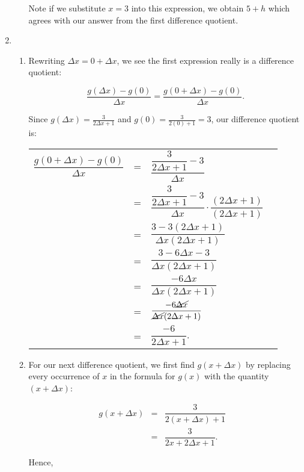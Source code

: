 \begin{ex}
\begin{enumerate}
\begin{enumerate}
Note if we substitute $x=3$ into this expression, we obtain $5+h$ which agrees with our answer from the first difference quotient.

\end{enumerate}

\item 

\begin{enumerate}

\item Rewriting $\Delta x = 0 + \Delta x$, we see the first expression really is a difference quotient:

\[ \dfrac{g(\Delta x)-g(0)}{\Delta x} = \dfrac{g(0+\Delta x)-g(0)}{\Delta x}.\]

Since $g(\Delta x) = \frac{3}{2 \Delta x + 1}$ and $g(0) = \frac{3}{2(0)+1} = 3$, our difference quotient is:

\begin{longtable}{rclr}  

$\dfrac{g(0+\Delta x)-g(0)}{\Delta x}$ & = & $\dfrac{\dfrac{3}{2\Delta x+1}-3}{\Delta x}$ & \\ [10pt]
& = &  $\dfrac{\dfrac{3}{2\Delta x+1}-3}{\Delta x} \cdot \dfrac{(2\Delta x+1)}{(2\Delta x+1)}$ & \\ [10pt]
& = &  $\dfrac{3-3(2\Delta x+1)}{\Delta x(2\Delta x+1)}$  & \\ [10pt]
& = &  $\dfrac{3 - 6 \Delta x - 3}{\Delta x(2\Delta x+1)}$  & \\ [10pt]
& = &  $\dfrac{-6\Delta x}{\Delta x(2\Delta x+1)}$  & \\ [10pt]
& = &  $\dfrac{-6\cancel{\Delta x}}{\cancel{\Delta x}(2\Delta x+1)}$  & \\ [10pt]
& = &  $\dfrac{-6}{2\Delta x+1}$.  & \\ 

\end{longtable}

\item For our next difference quotient, we first find $g(x+\Delta x)$ by replacing every occurrence of $x$ in the formula for $g(x)$ with the quantity $(x+\Delta x)$:

 \[ \begin{array}{rclr}  
 g(x+\Delta x) & = & \dfrac{3}{2(x+\Delta x)+1} & \\
 & = & \dfrac{3}{2x+2\Delta x+1}.
 \end{array} \]

Hence,


\end{enumerate}
\end{enumerate}
\end{ex}
